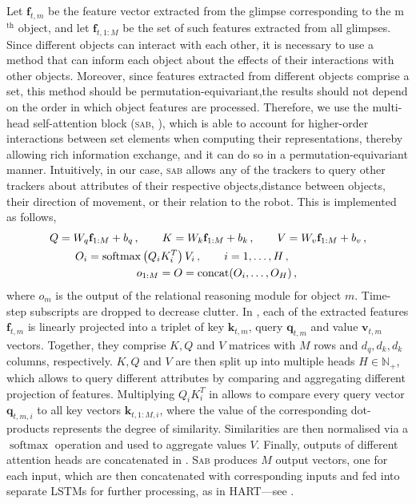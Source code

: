 Let $\mathbf{f}_{t, m}$ be the feature vector extracted from the glimpse corresponding to the m$^\mathrm{th}$ object, and let $\mathbf{f}_{t, 1:M}$ be the set of such features extracted from all glimpses.
Since different objects can interact with each other, it is necessary to use a method that can inform each object about the effects of their interactions with other objects.
Moreover, since features extracted from different objects comprise a set, this method should be permutation-equivariant,\ie the results should not depend on the order in which object features are processed.
Therefore, we use the multi-head self-attention block (\textsc{sab}, \citet{Lee2019settransformer}), which is able to account for higher-order interactions between set elements when computing their representations, thereby allowing rich information exchange, and it can do so in a permutation-equivariant manner.
Intuitively, in our case, \textsc{sab} allows any of the trackers to query other trackers about attributes of their respective objects,\eg distance between objects, their direction of movement, or their relation to the robot.
This is implemented as follows,
\begin{align}
Q &= W_q \mathbf{f}_{1:M} + b_q\,, \qquad K = W_k \mathbf{f}_{1:M} + b_k\,, \qquad V = W_v \mathbf{f}_{1:M} + b_v \label{eq:projection}\,,\\
&\hspace{1.5em} O_i = \operatorname{softmax}\left( Q_i K_i^T \right) V_i\,, \qquad i=1,\dots,H\,, \label{eq:att}\\
&\hspace{7em} o_{1:M} = O = \operatorname{concat}(O_i,\dots,O_H)\,, \label{eq:multihead}
\end{align}
where $o_m$ is the output of the relational reasoning module for object $m$. Time-step subscripts are dropped to decrease clutter.
In , each of the extracted features $\mathbf{f}_{t,m}$ is linearly projected into a triplet of key $\mathbf{k}_{t,m}$, query $\mathbf{q}_{t,m}$ and value $\mathbf{v}_{t,m}$ vectors. Together, they comprise $K, Q$ and $V$ matrices with $M$ rows and $d_q, d_k, d_k$ columns, respectively.
$K, Q$ and $V$ are then split up into multiple heads $H \in \mathbb{N}_+$, which allows to query different attributes by comparing and aggregating different projection of features.
Multiplying $Q_iK_i^T$ in  allows to compare every query vector $\mathbf{q}_{t,m,i}$ to all key vectors $\mathbf{k}_{t,1:M,i}$, where the value of the corresponding dot-products represents the degree of similarity.
Similarities are then normalised via a $\operatorname{softmax}$ operation and used to aggregate values $V$.
Finally, outputs of different attention heads are concatenated in .
\textsc{Sab} produces $M$ output vectors, one for each input, which are then concatenated with corresponding inputs and fed into separate \gls{LSTM}s for further processing, as in \gls{HART}---see .

